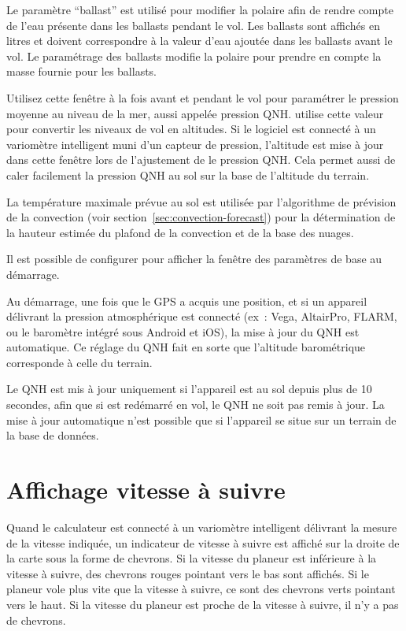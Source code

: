Le paramètre ``ballast'' est utilisé pour modifier la polaire afin de rendre compte de l'eau présente dans les ballasts pendant le vol.
Les ballasts sont affichés en litres et doivent correspondre à la valeur d'eau ajoutée dans les ballasts avant le vol.
Le paramétrage des ballasts modifie la polaire pour prendre en compte la masse fournie pour les ballasts.

Utilisez cette fenêtre à la fois avant et pendant le vol pour paramétrer le pression moyenne au niveau de la mer, aussi appelée pression QNH.\@
\xc{} utilise cette valeur pour convertir les niveaux de vol en altitudes.
Si le logiciel est connecté à un variomètre intelligent muni d'un capteur de pression, l'altitude est mise à jour dans cette fenêtre lors de l'ajustement de le pression QNH.\@
Cela permet aussi de caler facilement la pression QNH au sol sur la base de l'altitude du terrain.

La température maximale prévue au sol est utilisée par l'algorithme de prévision de la convection (voir section~\ref{sec:convection-forecast}) pour la détermination de la hauteur estimée du plafond de la convection et de la base des nuages.

\tip{} Il est possible de configurer \xc{} pour afficher la fenêtre des paramètres de base au démarrage.

Au démarrage, une fois que le GPS a acquis une position, et si un appareil délivrant la pression atmosphérique est connecté (ex~: Vega, AltairPro, FLARM, ou le baromètre intégré sous Android et iOS), la mise à jour du QNH est automatique.
Ce réglage du QNH fait en sorte que l'altitude barométrique corresponde à celle du terrain.

Le QNH est mis à jour uniquement si l'appareil est au sol depuis plus de 10 secondes, afin que si \xc{} est redémarré en vol, le QNH ne soit pas remis à jour.
La mise à jour automatique n'est possible que si l'appareil se situe sur un terrain de la base de données.

\section{Affichage vitesse à suivre}

Quand le calculateur est connecté à un variomètre intelligent délivrant la mesure de la vitesse indiquée, un indicateur de vitesse à suivre est affiché sur la droite de la carte sous la forme de chevrons.
Si la vitesse du planeur est inférieure à la vitesse à suivre, des chevrons rouges pointant vers le bas sont affichés.
Si le planeur vole plus vite que la vitesse à suivre, ce sont des chevrons verts pointant vers le haut.
Si la vitesse du planeur est proche de la vitesse à suivre, il n'y a pas de chevrons.

